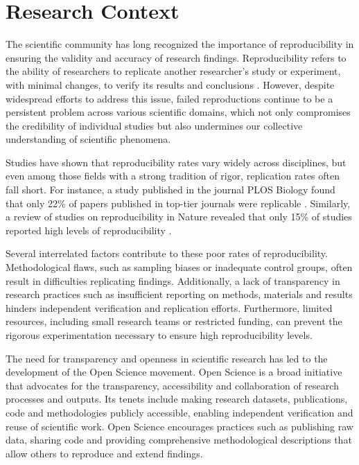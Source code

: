 \documentclass{article}
\begin{document}
\section{Research Context}

The scientific community has long recognized the importance of reproducibility in ensuring the validity and accuracy of research findings. Reproducibility refers to the ability of researchers to replicate another researcher's study or experiment, with minimal changes, to verify its results and conclusions \cite{vasilevsky_reproducibility_2013}. However, despite widespread efforts to address this issue, failed reproductions continue to be a persistent problem across various scientific domains, which not only compromises the credibility of individual studies but also undermines our collective understanding of scientific phenomena.

Studies have shown that reproducibility rates vary widely across disciplines, but even among those fields with a strong tradition of rigor, replication rates often fall short. For instance, a study published in the journal PLOS Biology found that only 22\% of papers published in top-tier journals were replicable \cite{freedman_economics_2015}. Similarly, a review of studies on reproducibility in Nature revealed that only 15\% of studies reported high levels of reproducibility \cite{landis_call_2012}.

Several interrelated factors contribute to these poor rates of reproducibility. Methodological flaws, such as sampling biases or inadequate control groups, often result in difficulties replicating findings. Additionally, a lack of transparency in research practices such as insufficient reporting on methods, materials and results hinders independent verification and replication efforts. Furthermore, limited resources, including small research teams or restricted funding, can prevent the rigorous experimentation necessary to ensure high reproducibility levels.

The need for transparency and openness in scientific research has led to the development of the Open Science movement. Open Science is a broad initiative that advocates for the transparency, accessibility and collaboration of research processes and outputs. Its tenets include making research datasets, publications, code and methodologies publicly accessible, enabling independent verification and reuse of scientific work. Open Science encourages practices such as publishing raw data, sharing code and providing comprehensive methodological descriptions that allow others to reproduce and extend findings.
\end{document}
